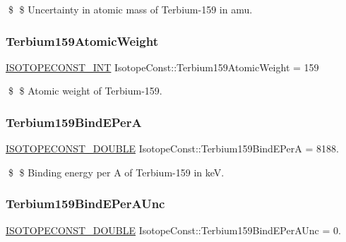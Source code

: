 \$ \$ Uncertainty in atomic mass of Terbium-\/159 in amu. \mbox{\label{group___isotope_const-_terbium-_tb159_ga0c2ccc5ba89937e8cfd6db36dcf32e3d}} 
\subsubsection{\texorpdfstring{Terbium159\+Atomic\+Weight}{Terbium159AtomicWeight}}
{\footnotesize\ttfamily \mbox{\hyperlink{group___isotope_const-_macros_ga5f18360b3e99483a35c32d789e62621c}{I\+S\+O\+T\+O\+P\+E\+C\+O\+N\+S\+T\+\_\+\+I\+NT}} Isotope\+Const\+::\+Terbium159\+Atomic\+Weight = 159}

\$ \$ Atomic weight of Terbium-\/159. \mbox{\label{group___isotope_const-_terbium-_tb159_ga9e1290d485cb6f491a2616d657dbba17}} 
\subsubsection{\texorpdfstring{Terbium159\+Bind\+E\+PerA}{Terbium159BindEPerA}}
{\footnotesize\ttfamily \mbox{\hyperlink{group___isotope_const-_macros_ga8f45a7272ce02c0b4c65c44636ed719a}{I\+S\+O\+T\+O\+P\+E\+C\+O\+N\+S\+T\+\_\+\+D\+O\+U\+B\+LE}} Isotope\+Const\+::\+Terbium159\+Bind\+E\+PerA = 8188.}

\$ \$ Binding energy per A of Terbium-\/159 in keV. \mbox{\label{group___isotope_const-_terbium-_tb159_ga2f9ae881e3074cdd23a3b66c95c0a736}} 
\subsubsection{\texorpdfstring{Terbium159\+Bind\+E\+Per\+A\+Unc}{Terbium159BindEPerAUnc}}
{\footnotesize\ttfamily \mbox{\hyperlink{group___isotope_const-_macros_ga8f45a7272ce02c0b4c65c44636ed719a}{I\+S\+O\+T\+O\+P\+E\+C\+O\+N\+S\+T\+\_\+\+D\+O\+U\+B\+LE}} Isotope\+Const\+::\+Terbium159\+Bind\+E\+Per\+A\+Unc = 0.}

